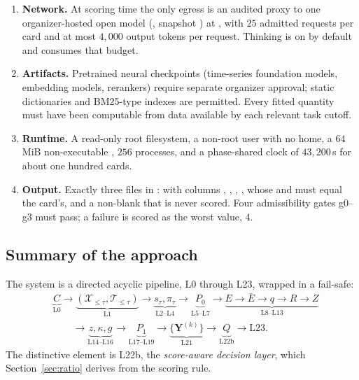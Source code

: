 \begin{enumerate}[leftmargin=*]
  \item \textbf{Network.} At scoring time the only egress is an audited proxy to one organizer-hosted open model
  (, snapshot ) at , with
  $25$ admitted requests per card and at most $4{,}000$ output tokens per request. Thinking is on by default and consumes that budget.
  \item \textbf{Artifacts.} Pretrained neural checkpoints (time-series foundation models, embedding models, rerankers) require separate
  organizer approval; static dictionaries and BM25-type indexes are permitted. Every fitted quantity must have been computable from data
  available by each relevant task cutoff.
  \item \textbf{Runtime.} A read-only root filesystem, a non-root user with no home, a $64$\,MiB non-executable , $256$ processes,
  and a phase-shared clock of $43{,}200$\,s for about one hundred cards.
  \item \textbf{Output.} Exactly three files in :  with columns
  , , , ,  whose  and  must equal the
  card's, and a non-blank  that is never scored. Four admissibility gates g0--g3 must pass; a failure is scored
  as the worst value, $4$.
\end{enumerate}

\subsection{Summary of the approach}

The system is a directed acyclic pipeline, L0 through L23, wrapped in a fail-safe:
\begin{align*}
&\underbrace{C}_{\text{L0}}\to\underbrace{(\mathcal{X}_{\le\tau},\mathcal{T}_{\le\tau})}_{\text{L1}}\to
\underbrace{s_\tau,\pi_\tau}_{\text{L2--L4}}\to\underbrace{P_0}_{\text{L5--L7}}\to
\underbrace{E\to\bar E\to q\to R\to Z}_{\text{L8--L13}}\\
&\qquad\to\underbrace{z,\kappa,g}_{\text{L14--L16}}\to
\underbrace{P_1}_{\text{L17--L19}}\to\underbrace{\{\bm Y^{(k)}\}}_{\text{L21}}\to\underbrace{Q}_{\text{L22b}}\to\text{L23}.
\end{align*}
The distinctive element is L22b, the \emph{score-aware decision layer}, which Section~\ref{sec:ratio} derives from the scoring rule.
